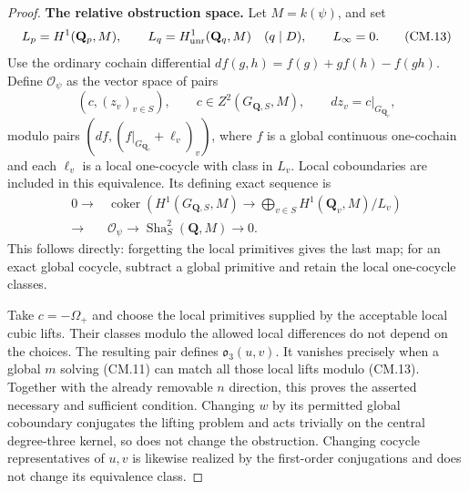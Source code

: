 \documentclass[11pt,a4paper]{article}
\theoremstyle{definition}
\renewcommand{\paragraph}[1]{\par\smallskip\noindent\textbf{#1}\quad\ignorespaces}
\newcommand{\Sha}{\operatorname{Sha}}
\begin{document}
\begin{proof}
\paragraph{The relative obstruction space.}
Let $M=k(\psi)$, and set
\[
 L_p=H^1(\mathbf Q_p,M),\qquad
 L_q=H^1_{\rm unr}(\mathbf Q_q,M)\quad(q\mid D),
 \qquad L_\infty=0.                                    \tag{CM.13}
\]
Use the ordinary cochain differential
$df(g,h)=f(g)+g f(h)-f(gh)$.
Define $\mathcal O_\psi$ as the vector space of pairs
\[
 (c,(z_v)_{v\in S}),\qquad
 c\in Z^2(G_{\mathbf Q,S},M),\qquad dz_v=c|_{G_{\mathbf Q_v}},
                                                               \tag{CM.14}
\]
modulo pairs
$(df,(f|_{G_{\mathbf Q_v}}+\ell_v)_v)$, where $f$ is a
global continuous one-cochain and each $\ell_v$ is a local
one-cocycle with class in $L_v$.  Local coboundaries are
included in this equivalence.  Its defining exact sequence is
\[
\begin{split}
0\longrightarrow&
 \operatorname{coker}\!\left(
 H^1(G_{\mathbf Q,S},M)\longrightarrow
       \bigoplus_{v\in S}H^1(\mathbf Q_v,M)/L_v\right)\\
\longrightarrow&\mathcal O_\psi
\longrightarrow\Sha^2_S(\mathbf Q,M)\longrightarrow0 .
\end{split}                                                   \tag{CM.15}
\]
This follows directly: forgetting the local primitives gives
the last map; for an exact global cocycle, subtract a global
primitive and retain the local one-cocycle classes.

Take $c=-\Omega_+$ and choose the local primitives supplied
by the acceptable local cubic lifts.  Their classes modulo
the allowed local differences do not depend on the choices.
The resulting pair defines $\mathfrak o_3(u,v)$.
It vanishes precisely when a global $m$ solving (CM.11)
can match all those local lifts modulo (CM.13).
Together with the already removable $n$ direction, this
proves the asserted necessary and sufficient condition.
Changing $w$ by its permitted global coboundary conjugates
the lifting problem and acts trivially on the central
degree-three kernel, so does not change the obstruction.
Changing cocycle representatives of $u,v$ is likewise
realized by the first-order conjugations and does not
change its equivalence class.


\end{proof}
\end{document}
